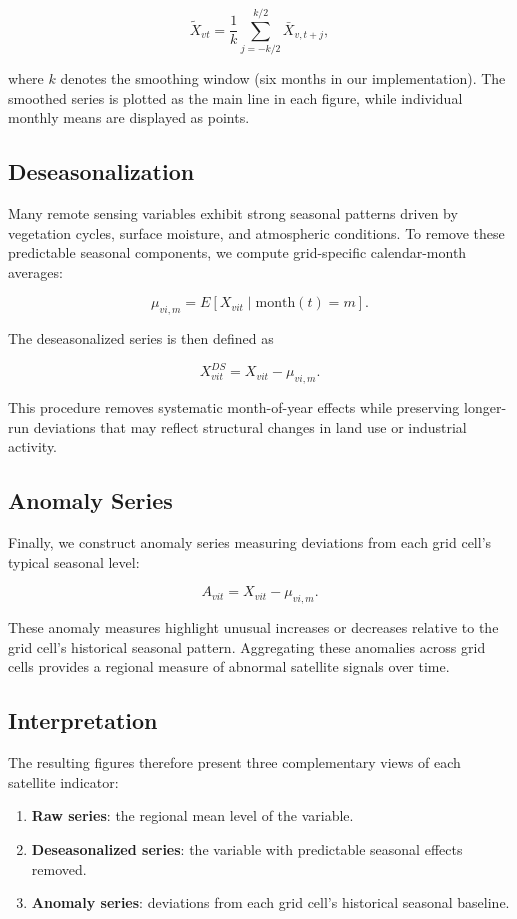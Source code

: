 \documentclass[12pt]{article}
\begin{document}
\[
\tilde{X}_{vt}
=
\frac{1}{k}
\sum_{j=-k/2}^{k/2} \bar{X}_{v,t+j},
\]

where $k$ denotes the smoothing window (six months in our implementation). The smoothed series is plotted as the main line in each figure, while individual monthly means are displayed as points.

\subsection{Deseasonalization}

Many remote sensing variables exhibit strong seasonal patterns driven by vegetation cycles, surface moisture, and atmospheric conditions. To remove these predictable seasonal components, we compute grid-specific calendar-month averages:

\[
\mu_{vi,m} =
E\left[ X_{vit} \mid \text{month}(t)=m \right].
\]

The deseasonalized series is then defined as

\[
X^{DS}_{vit} =
X_{vit} - \mu_{vi,m}.
\]

This procedure removes systematic month-of-year effects while preserving longer-run deviations that may reflect structural changes in land use or industrial activity.

\subsection{Anomaly Series}

Finally, we construct anomaly series measuring deviations from each grid cell’s typical seasonal level:

\[
A_{vit} =
X_{vit} - \mu_{vi,m}.
\]

These anomaly measures highlight unusual increases or decreases relative to the grid cell’s historical seasonal pattern. Aggregating these anomalies across grid cells provides a regional measure of abnormal satellite signals over time.

\subsection{Interpretation}

The resulting figures therefore present three complementary views of each satellite indicator:

\begin{enumerate}
    \item \textbf{Raw series}: the regional mean level of the variable.
    \item \textbf{Deseasonalized series}: the variable with predictable seasonal effects removed.
    \item \textbf{Anomaly series}: deviations from each grid cell's historical seasonal baseline.
\end{enumerate}
\end{document}
